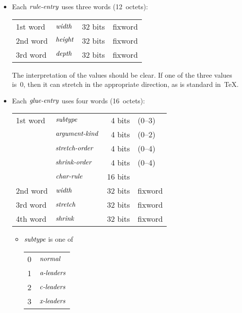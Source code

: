 \documentclass[fleqn]{article}
\newcommand{\myit}[1]{\mbox{\emph{#1}}}
\begin{document}
\begin{itemize}
\item
Each $\myit{rule-entry}$ uses three words (12~octets):
\vspace*{.1cm}

\begin{tabular}{llrl}
1st word & $\myit{width}$ & 32 bits & fixword\\
2nd word & $\myit{height}$ & 32 bits & fixword\\
3rd word & $\myit{depth}$ & 32 bits & fixword\\
\end{tabular}
\vspace*{.1cm}

The interpretation of the values should be clear.  If one of the 
three values is~0, then it can stretch in the appropriate direction,
as is standard in~\TeX.
\item
Each $\myit{glue-entry}$ uses four words (16~octets):
\vspace*{.1cm}

\begin{tabular}{llrl}
1st word & $\myit{subtype}$ & 4 bits & (0--3)\\
& $\myit{argument-kind}$ & 4 bits & (0--2)\\
& $\myit{stretch-order}$ & 4 bits & (0--4)\\
& $\myit{shrink-order}$ & 4 bits & (0--4)\\
& $\myit{char-rule}$ & 16 bits\\
2nd word & $\myit{width}$ & 32 bits &  fixword\\
3rd word & $\myit{stretch}$ & 32 bits &  fixword\\
4th word & $\myit{shrink}$ & 32 bits &  fixword\\
\end{tabular}
\vspace*{.1cm}

\begin{itemize}
\item$\myit{subtype}$ is one of
\vspace*{.1cm}

\begin{tabular}{ll}
0 & $\myit{normal}$\\
1 & $\myit{a-leaders}$\\
2 & $\myit{c-leaders}$\\
3 & $\myit{x-leaders}$\\
\end{tabular}
\vspace*{.1cm}


\end{itemize}
\end{itemize}
\end{document}
